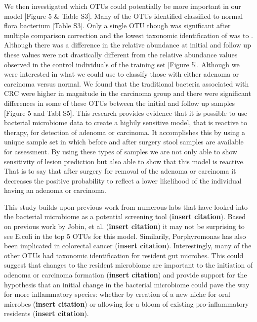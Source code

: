 \documentclass[12pt,]{article}
\begin{document}
We then investigated which OTUs could potentially be more important in
our model {[}Figure 5 \& Table S3{]}. Many of the OTUs identified
classified to normal flora bacterium {[}Table S3{]}. Only a single OTU
though was significant after multiple comparison correction and the
lowest taxonomic identification of was to . Although there was a
difference in the relative abundance at initial and follow up these
values were not drastically different from the relative abundance values
observed in the control individuals of the training set {[}Figure 5{]}.
Although we were interested in what we could use to classify those with
either adenoma or carcinoma versus normal. We found that the traditional
bacteria associated with CRC were higher in magnitude in the carcinoma
group and there were significant differences in some of these OTUs
between the initial and follow up samples {[}Figure 5 and Tabl S5{]}.
This research provides evidence that it is possible to use bacterial
microbiome data to create a highily sensitive model, that is reactive to
therapy, for detection of adenoma or carcinoma. It accomplishes this by
using a unique sample set in which before and after surgery stool
samples are available for assessment. By using these types of samples we
are not only able to show sensitivity of lesion prediction but also able
to show that this model is reactive. That is to say that after surgery
for removal of the adenoma or carcinoma it decreases the positive
probability to reflect a lower likelihood of the individual having an
adenoma or carcinoma.

This study builds upon previous work from numerous labs that have looked
into the bacterial microbiome as a potential screening tool
(\textbf{insert citation}). Based on previous work by Jobin, et al.
(\textbf{insert citation}) it may not be surprising to see E.coli in the
top 5 OTUs for this model. Similarily, Porphyromonas has also been
implicated in colorectal cancer (\textbf{insert citation}).
Interestingly, many of the other OTUs had taxonomic identification for
resident gut microbes. This could suggest that changes to the resident
microbiome are important to the initiation of adenoma or carcinoma
formation (\textbf{insert citation}) and provide support for the
hypothesis that an initial change in the bacterial microbiome could pave
the way for more inflammatory species: whether by creation of a new
niche for oral microbes (\textbf{insert citation}) or allowing for a
bloom of existing pro-inflammatory residents (\textbf{insert citation}).
\end{document}

